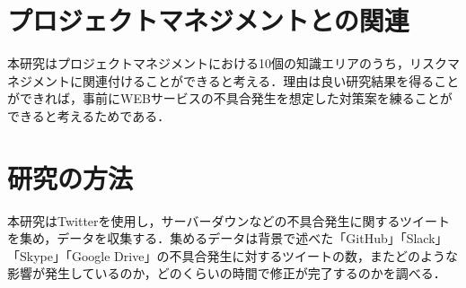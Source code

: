 \documentclass[uplatex,twocolumn,dvipdfmx]{jsarticle}
\begin{document}
\section{プロジェクトマネジメントとの関連}
本研究はプロジェクトマネジメントにおける10個の知識エリアのうち，リスクマネジメントに関連付けることができると考える．理由は良い研究結果を得ることができれば，事前にWEBサービスの不具合発生を想定した対策案を練ることができると考えるためである．


\section{研究の方法}
本研究はTwitterを使用し，サーバーダウンなどの不具合発生に関するツイートを集め，データを収集する．集めるデータは背景で述べた「GitHub」「Slack」「Skype」「Google Drive」の不具合発生に対するツイートの数，またどのような影響が発生しているのか，どのくらいの時間で修正が完了するのかを調べる\cite{03}．


\end{document}
